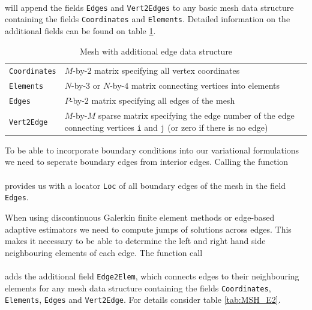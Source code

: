  \\

\noindent will append the fields {\tt Edges} and {\tt Vert2Edges} to any basic mesh data structure containing the fields
{\tt Coordinates} and {\tt Elements}. Detailed information on the additional fields can be found on table \ref{tab:MSH_E}.

\begin{table}[htb]
  \begin{tabular}{p{2cm}p{9cm}}
    {\tt Coordinates} & {\small $M$-by-$2$ matrix specifying all vertex coordinates}                 \\
    {\tt Elements}    & {\small $N$-by-$3$ or $N$-by-$4$ matrix connecting vertices into elements}   \\
    {\tt Edges}       & {\small $P$-by-$2$ matrix specifying all edges of the mesh}                  \\
    {\tt Vert2Edge}   & {\small $M$-by-$M$ sparse matrix specifying the edge number
                        of the edge connecting vertices {\tt i} and {\tt j} (or zero
                        if there is no edge)}
  \end{tabular}
  \caption{Mesh with additional edge data structure}
  \label{tab:MSH_E}
\end{table}

To be able to incorporate boundary conditions into our variational formulations we need to seperate boundary edges
from interior edges. Calling the function \\

 \\

\noindent provides us with a locator {\tt Loc} of all boundary edges of the mesh in the field {\tt Edges}.

When using discontinuous Galerkin finite element methods or edge-based adaptive estimators we need to compute jumps
of solutions across edges. This makes it necessary to be able to determine the left and right hand side neighbouring
elements of each edge. The function call \\

 \\

\noindent adds the additional field {\tt Edge2Elem}, which connects edges to their neighbouring elements for any mesh
data structure containing the fields {\tt Coordinates}, {\tt Elements}, {\tt Edges} and {\tt Vert2Edge}. For details
consider table \ref{tab:MSH_E2}.

